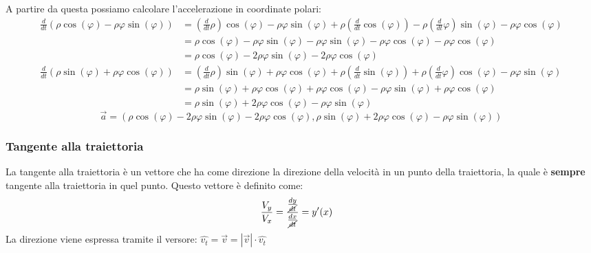            A partire da questa possiamo calcolare l'accelerazione in coordinate polari:
            $$
                \begin{aligned}
                    \frac{d}{dt}(\rho\cos(\varphi)-\rho\varphi\sin(\varphi)) &= \left(\frac{d}{dt}\rho\right)\cos(\varphi)-\rho\varphi\sin(\varphi)+\rho\left(\frac{d}{dt}\cos(\varphi)\right)-\rho\left(\frac{d}{dt}\varphi\right)\sin(\varphi)-\rho\varphi\cos(\varphi)\\
                    &= \rho\cos(\varphi)-\rho\varphi\sin(\varphi)-\rho\varphi\sin(\varphi)-\rho\varphi\cos(\varphi)-\rho\varphi\cos(\varphi)\\
                    &= \rho\cos(\varphi)-2\rho\varphi\sin(\varphi)-2\rho\varphi\cos(\varphi)\\
                    \frac{d}{dt}(\rho\sin(\varphi)+\rho\varphi\cos(\varphi)) &= \left(\frac{d}{dt}\rho\right)\sin(\varphi)+\rho\varphi\cos(\varphi)+\rho\left(\frac{d}{dt}\sin(\varphi)\right)+\rho\left(\frac{d}{dt}\varphi\right)\cos(\varphi)-\rho\varphi\sin(\varphi)\\
                    &= \rho\sin(\varphi)+\rho\varphi\cos(\varphi)+\rho\varphi\cos(\varphi)-\rho\varphi\sin(\varphi)+\rho\varphi\cos(\varphi)\\
                    &= \rho\sin(\varphi)+2\rho\varphi\cos(\varphi)-\rho\varphi\sin(\varphi)
                \end{aligned}
            $$
            $$
                \vec{a}=\left(\rho\cos(\varphi)-2\rho\varphi\sin(\varphi)-2\rho\varphi\cos(\varphi), \rho\sin(\varphi)+2\rho\varphi\cos(\varphi)-\rho\varphi\sin(\varphi)\right)
            $$
        \subsubsection{Tangente alla traiettoria}
            La tangente alla traiettoria è un vettore che ha come direzione la direzione della velocità in un punto della traiettoria, la quale è \textbf{sempre} tangente alla traiettoria in quel punto. Questo vettore è definito come:
            $$
                \begin{aligned}
                    \frac{V_y}{V_x} &= \frac{\frac{dy}{\cancel{dt}}}{\frac{dx}{\cancel{dt}}} = y'(x)
                \end{aligned}
            $$
            La direzione viene espressa tramite il versore: $ \hat{v_t}=\vec{v}=\left|\vec{v}\right|\cdot\hat{v_t}$
